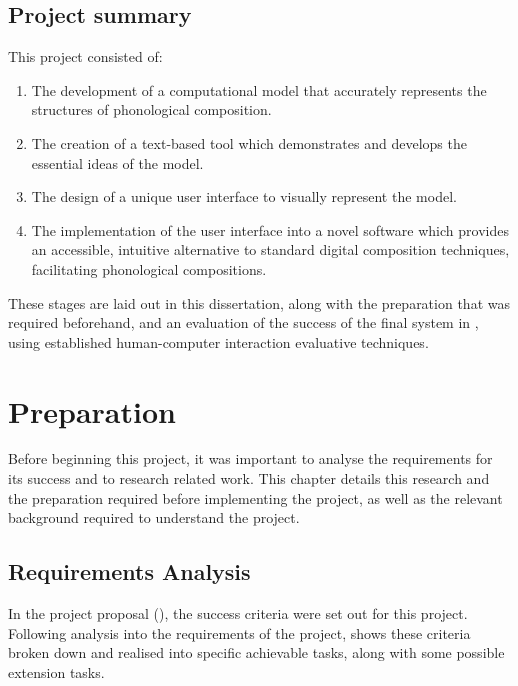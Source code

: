 \documentclass[12pt,a4paper,oneside,openright]{report}
\begin{document}
\section{Project summary}
This project consisted of:
\begin{enumerate}
    \item The development of a computational model that accurately represents the structures of phonological composition.
    \item The creation of a text-based tool which demonstrates and develops the essential ideas of the model.
    \item The design of a unique user interface to visually represent the model.
    \item The implementation of the user interface into a novel software which provides an accessible, intuitive alternative to standard digital composition techniques, facilitating phonological compositions.
\end{enumerate}

These stages are laid out in this dissertation, along with the preparation that was required beforehand, and an evaluation of the success of the final system in , using established human-computer interaction evaluative techniques.

\chapter{Preparation}\label{chap:prep}
Before beginning this project, it was important to analyse the requirements for its success and to research related work. This chapter details this research and the preparation required before implementing the project, as well as the relevant background required to understand the project.

\section{Requirements Analysis}\label{sec:req_anal}
In the project proposal (), the success criteria were set out for this project. Following analysis into the requirements of the project,  shows these criteria broken down and realised into specific achievable tasks, along with some possible extension tasks.
\end{document}
